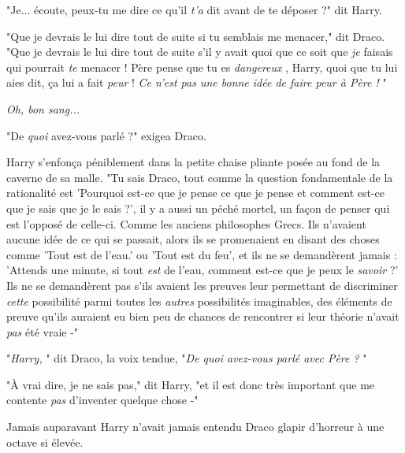 "Je... écoute, peux-tu me dire ce qu'il \emph{t'a}  dit avant de te déposer ?" dit Harry.

"Que je devrais le lui dire tout de suite si tu semblais me menacer," dit Draco. "Que je devrais le lui dire tout de suite s'il y avait quoi que ce soit que \emph{je}  faisais qui pourrait \emph{te}  menacer ! Père pense que tu es \emph{dangereux} , Harry, quoi que tu lui aies dit, ça lui a fait \emph{peur}  ! \emph{Ce n'est pas une bonne idée de faire peur à Père !} "

\emph{Oh, bon sang...} 

"De \emph{quoi}  avez-vous parlé ?" exigea Draco.

Harry s'enfonça péniblement dans la petite chaise pliante posée au fond de la caverne de sa malle. "Tu sais Draco, tout comme la question fondamentale de la rationalité est 'Pourquoi est-ce que je pense ce que je pense et comment est-ce que je sais que je le sais ?', il y a aussi un péché mortel, un façon de penser qui est l'opposé de celle-ci. Comme les anciens philosophes Grecs. Ils n'avaient aucune idée de ce qui se passait, alors ils se promenaient en disant des choses comme 'Tout est de l'eau.' ou 'Tout est du feu', et ils ne se demandèrent jamais : 'Attends une minute, si tout \emph{est}  de l'eau, comment est-ce que je peux le \emph{savoir}  ?' Ils ne se demandèrent pas s'ils avaient les preuves leur permettant de discriminer \emph{cette}  possibilité parmi toutes les \emph{autres}  possibilités imaginables, des éléments de preuve qu'ils auraient eu bien peu de chances de rencontrer si leur théorie n'avait \emph{pas}  été vraie -"

"\emph{Harry,} " dit Draco, la voix tendue, "\emph{De quoi avez-vous parlé avec Père ?} "

"À vrai dire, je ne sais pas," dit Harry, "et il est donc très important que me contente \emph{pas } d'inventer quelque chose -"

Jamais auparavant Harry n'avait jamais entendu Draco glapir d'horreur à une octave si élevée.

